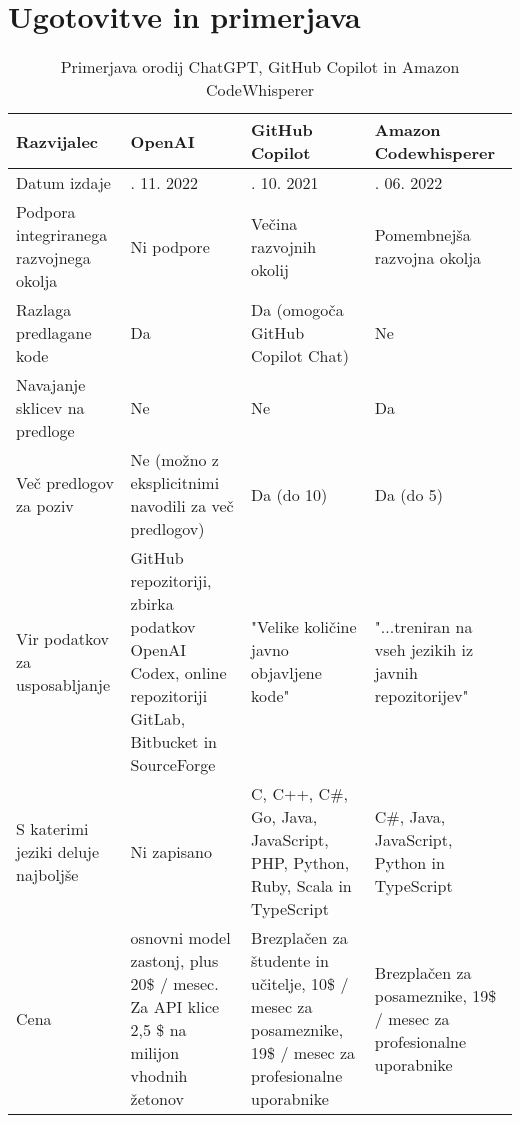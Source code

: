 \documentclass[a4paper,12pt,openright]{book}
\begin{document}
\section{Ugotovitve in primerjava}



\begin{longtable}{|>{\raggedright\arraybackslash}p{2.5cm}|>{\raggedright\arraybackslash}p{3cm}|>{\raggedright\arraybackslash}p{3.5cm}|>{\raggedright\arraybackslash}p{3cm}|}
\caption{Primerjava orodij ChatGPT, GitHub Copilot in Amazon CodeWhisperer} \label{fig:primerjava-tabela}\\
\hline
Razvijalec              & OpenAI      & GitHub Copilot                 & Amazon Codewhisperer            \\ \hline
Datum izdaje               & 30. 11. 2022        & 29. 10. 2021           & 23. 06. 2022       \\ \hline
Podpora integriranega razvojnega okolja           & Ni podpore          & Večina razvojnih okolij        & Pomembnejša razvojna okolja          \\ \hline
Razlaga predlagane kode       & Da                       & Da (omogoča GitHub Copilot Chat)                           & Ne                       \\ \hline
Navajanje sklicev na predloge                  & Ne                      & Ne                    & Da                      \\ \hline
Več predlogov za poziv                & Ne (možno z eksplicitnimi navodili za več predlogov)         & Da (do 10)                  & Da (do 5)               \\ \hline
Vir podatkov za usposabljanje             & GitHub repozitoriji, zbirka podatkov OpenAI Codex, online repozitoriji GitLab, Bitbucket in SourceForge                   & "Velike količine javno objavljene kode"                  & "...treniran na vseh jezikih iz javnih repozitorijev"                    \\ \hline
S katerimi jeziki deluje najboljše                        & Ni zapisano                  & C, C++, C\#, Go, Java, JavaScript, PHP, Python, Ruby, Scala in TypeScript              & C\#, Java, JavaScript, Python in TypeScript  \\ \hline
Cena               & osnovni model zastonj, plus 20\$ / mesec. Za API klice 2,5 \$ na milijon vhodnih žetonov           & Brezplačen za študente in učitelje, 10\$ / mesec za posameznike, 19\$ / mesec za profesionalne uporabnike                    &   Brezplačen za posameznike, 19\$ / mesec za profesionalne uporabnike   \\ \hline
\end{longtable}
\end{document}
